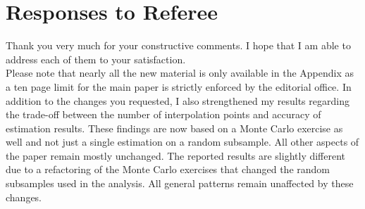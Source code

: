 \newpage\section*{Responses to Referee}\vspace{1.0cm}
Thank you very much for your constructive comments. I hope that I am able to address each of them to your satisfaction.\\\newline
%
Please note that nearly all the new material is only available in the Appendix as a ten page limit for the main paper is strictly enforced by the editorial office. In addition to the changes you requested, I also strengthened my results regarding the trade-off between the number of interpolation points and accuracy of estimation results. These findings are now based on a Monte Carlo exercise as well and not just a single estimation on a random subsample. All other aspects of the paper remain mostly unchanged. The reported results are slightly different due to a refactoring of the Monte Carlo exercises that changed the random subsamples used in the analysis. All general patterns remain unaffected by these changes.
